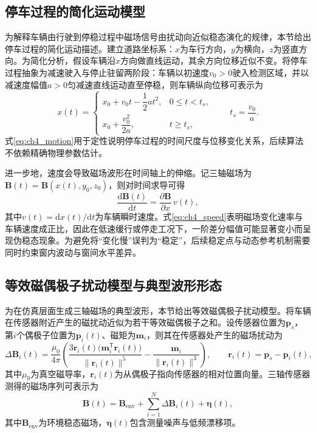 \documentclass{xdupgthesis}
\begin{document}
\subsection{停车过程的简化运动模型}
\label{subsec:ch4_motion}

为解释车辆由行驶到停稳过程中磁场信号由扰动向近似稳态演化的规律，本节给出停车过程的简化运动描述。建立道路坐标系：$x$为车行方向，$y$为横向，$z$为竖直方向。为简化分析，假设车辆沿$x$方向做直线运动，其余方向位移近似不变。将停车过程抽象为减速驶入与停止驻留两阶段：车辆以初速度$v_0>0$驶入检测区域，并以减速度幅值$a>0$匀减速直线运动直至停稳，则车辆纵向位移可表示为
\begin{equation}
x(t)=
\begin{cases}
x_0+v_0 t-\dfrac{1}{2}a t^2, & 0 \le t < t_s,\\[4pt]
x_0+\dfrac{v_0^2}{2a}, & t \ge t_s,
\end{cases}
\qquad
t_s=\dfrac{v_0}{a}.
\label{eq:ch4_motion}
\end{equation}
式\eqref{eq:ch4_motion}用于定性说明停车过程的时间尺度与位移变化关系，后续算法不依赖精确物理参数估计。

进一步地，速度会导致磁场波形在时间轴上的伸缩。记三轴磁场为$\mathbf{B}(t)=\mathbf{B}(x(t),y_0,z_0)$，则对时间求导可得
\begin{equation}
\dfrac{\mathrm{d}\mathbf{B}(t)}{\mathrm{d}t}
=
\dfrac{\partial \mathbf{B}}{\partial x}\, v(t),
\label{eq:ch4_speed}
\end{equation}
其中$v(t)=\mathrm{d}x(t)/\mathrm{d}t$为车辆瞬时速度。式\eqref{eq:ch4_speed}表明磁场变化速率与车辆速度成正比，因此在低速缓行或停走工况下，一阶差分幅值可能显著变小而呈现伪稳态现象。为避免将“变化慢”误判为“稳定”，后续稳定点与动态参考机制需要同时约束窗内波动与窗间水平差异。

\subsection{等效磁偶极子扰动模型与典型波形形态}
\label{subsec:ch4_dipole}

为在仿真层面生成三轴磁场的典型波形，本节给出等效磁偶极子扰动模型。将车辆在传感器附近产生的磁扰动近似为若干等效磁偶极子之和。设传感器位置为$\mathbf{p}_s$，第$i$个偶极子位置为$\mathbf{p}_i(t)$、磁矩为$\mathbf{m}_i$，则其在传感器处产生的磁场扰动为
\begin{equation}
\Delta\mathbf{B}_i(t)=
\dfrac{\mu_0}{4\pi}
\left(
\dfrac{3\mathbf{r}_i(t)\big(\mathbf{m}_i^{\mathsf{T}}\mathbf{r}_i(t)\big)}{\|\mathbf{r}_i(t)\|^5}
-
\dfrac{\mathbf{m}_i}{\|\mathbf{r}_i(t)\|^3}
\right),
\qquad
\mathbf{r}_i(t)=\mathbf{p}_s-\mathbf{p}_i(t),
\label{eq:ch4_dipole}
\end{equation}
其中$\mu_0$为真空磁导率，$\mathbf{r}_i(t)$为从偶极子指向传感器的相对位置向量。三轴传感器测得的磁场序列可表示为
\begin{equation}
\mathbf{B}(t)=\mathbf{B}_{\mathrm{env}} + \sum_{i=1}^{N}\Delta\mathbf{B}_i(t) + \boldsymbol{\eta}(t),
\label{eq:ch4_meas}
\end{equation}
其中$\mathbf{B}_{\mathrm{env}}$为环境稳态磁场，$\boldsymbol{\eta}(t)$包含测量噪声与低频漂移项。
\end{document}
